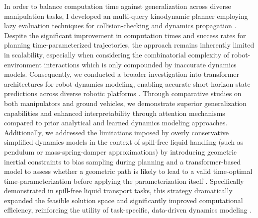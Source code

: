 In order to balance computation time against generalization across diverse manipulation tasks, I developed an multi-query kinodynamic planner employing lazy evaluation techniques for collision-checking and dynamics propagation \cite{pasricha2024virtues}. Despite the significant improvement in computation times and success rates for planning time-parameterized trajectories, the approach remains inherently limited in scalability, especially when considering the combinatorial complexity of robot-environment interactions which is only compounded by inaccurate dynamics models.
Consequently, we conducted a broader investigation into transformer architectures for robot dynamics modeling, enabling accurate short-horizon state predictions across diverse robotic platforms \cite{reed2024transformer}. Through comparative studies on both manipulators and ground vehicles, we demonstrate superior generalization capabilities and enhanced interpretability through attention mechanisms compared to prior analytical and learned dynamics modeling approaches.
Additionally, we addressed the limitations imposed by overly conservative simplified dynamics models in the context of spill-free liquid handling (such as pendulum or mass-spring-damper approximations) \cite{muchacho2022solution} by introducing geometric inertial constraints to bias sampling during planning and a transformer-based model to assess whether a geometric path is likely to lead to a valid time-optimal time-parameterization before applying the parameterization itself \cite{abderezaei2024clutter}. Specifically demonstrated in spill-free liquid transport tasks, this strategy dramatically expanded the feasible solution space and significantly improved computational efficiency, reinforcing the utility of task-specific, data-driven dynamics modeling \cite{reed2024transformer}.